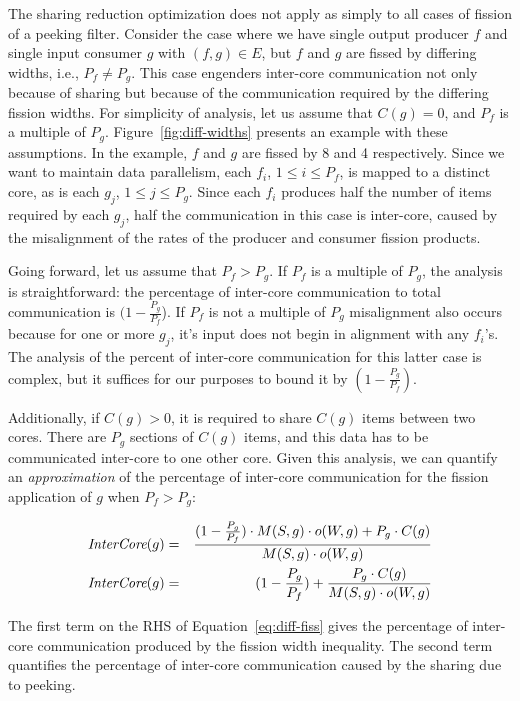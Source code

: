 The sharing reduction optimization does not apply as simply to all
cases of fission of a peeking filter.  Consider the case where we have
single output producer $f$ and single input consumer $g$ with $(f,g)
\in E$, but $f$ and $g$ are fissed by differing widths, i.e., $P_f \ne
P_g$.  This case engenders inter-core communication not only because
of sharing but because of the communication required by the differing
fission widths.  For simplicity of analysis, let us assume that $C(g)
= 0$, and $P_f$ is a multiple of $P_g$. Figure~\ref{fig:diff-widths}
presents an example with these assumptions.  In the example, $f$ and
$g$ are fissed by 8 and 4 respectively.  Since we want to maintain
data parallelism, each $f_i$, $1 \le i \le P_f$, is mapped to a
distinct core, as is each $g_j$, $1 \le j \le P_g$.  Since each $f_i$
produces half the number of items required by each $g_j$, half the
communication in this case is inter-core, caused by the misalignment
of the rates of the producer and consumer fission products.

Going forward, let us assume that $P_f > P_g$.  If $P_f$ is a multiple
of $P_g$, the analysis is straightforward: the percentage of inter-core
communication to total communication is $(1 - \frac{P_g}{P_f}$). If $P_f$ is
not a multiple of $P_g$ misalignment also occurs because for one or
more $g_j$, it's input does not begin in alignment with any $f_i$'s.
The analysis of the percent of inter-core communication for this latter
case is complex, but it suffices for our purposes to bound it by
$(1 - \frac{P_g}{P_f})$.

Additionally, if $C(g) > 0$, it is required to share $C(g)$ items
between two cores.  There are $P_g$ sections of $C(g)$ items, and this
data has to be communicated inter-core to one other core.  Given this
analysis, we can quantify an {\it approximation} of the percentage of
inter-core communication for the fission application of $g$ when $P_f
> P_g$:

\begin{align}
\mt{InterCore}(g) & = & \frac{(1 - \frac{P_g}{P_f}) \cdot M(S, g) \cdot o(W, g) +
P_g \cdot C(g)}{M(S, g) \cdot o(W, g)} \\
\label{eq:diff-fiss}
\mt{InterCore}(g) & = & (1 - \frac{P_g}{P_f}) +
\frac{P_g \cdot C(g)}{M(S, g) \cdot o(W, g)}
\end{align}

The first term on the RHS of Equation~\ref{eq:diff-fiss} gives the
percentage of inter-core communication produced by the fission width
inequality.  The second term quantifies the percentage of inter-core
communication caused by the sharing due to peeking.  

